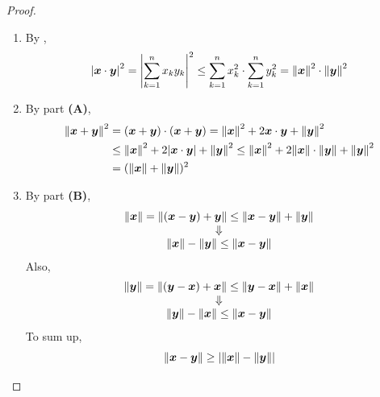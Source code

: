 \begin{proof}
    \begin{enumerate}[label=\textbf{(\Alph*)}]
        \item By ,
        \[
        \abs*{\bm{x} \cdot \bm{y}}^{2} = \abs*{\sum_{k = 1}^{n} x_{k}y_{k}}^{2} \leq
        \sum_{k = 1}^{n} x_{k}^{2} \cdot \sum_{k = 1}^{n} y_{k}^{2}
        = \norm*{\bm{x}}^{2} \cdot \norm*{\bm{y}}^{2}
        \]
        \item By part \textbf{(A)},
        \begin{align*}
            \norm*{\bm{x} + \bm{y}}^{2} &= (\bm{x} + \bm{y}) \cdot (\bm{x} + \bm{y})
            = \norm*{\bm{x}}^{2} + 2\bm{x} \cdot \bm{y} + \norm*{\bm{y}}^{2} \\
            &\leq \norm*{\bm{x}}^{2} + 2\abs*{\bm{x} \cdot \bm{y}} + \norm*{\bm{y}}^{2}
            \leq \norm*{\bm{x}}^{2} + 2\norm*{\bm{x}} \cdot \norm*{\bm{y}} + \norm*{\bm{y}}^{2} \\
            &= (\norm*{\bm{x}} + \norm*{\bm{y}})^{2}
        \end{align*}
        \item By part \textbf{(B)},
        \[
        \begin{array}{c}
            \norm*{\bm{x}} = \norm*{(\bm{x} - \bm{y}) + \bm{y}}
            \leq \norm*{\bm{x} - \bm{y}} + \norm*{\bm{y}} \\
            \Downarrow \\
            \norm*{\bm{x}} - \norm*{\bm{y}} \leq \norm*{\bm{x} - \bm{y}}
        \end{array}
        \]
        Also,
        \[
        \begin{array}{c}
            \norm*{\bm{y}} = \norm*{(\bm{y} - \bm{x}) + \bm{x}}
            \leq \norm*{\bm{y} - \bm{x}} + \norm*{\bm{x}} \\
            \Downarrow \\
            \norm*{\bm{y}} - \norm*{\bm{x}} \leq \norm*{\bm{x} - \bm{y}}
        \end{array}
        \]
        To sum up,
        \[
        \norm*{\bm{x} - \bm{y}} \geq \abs*{\norm*{\bm{x}} - \norm*{\bm{y}}}
        \]
    \end{enumerate}
\end{proof}
